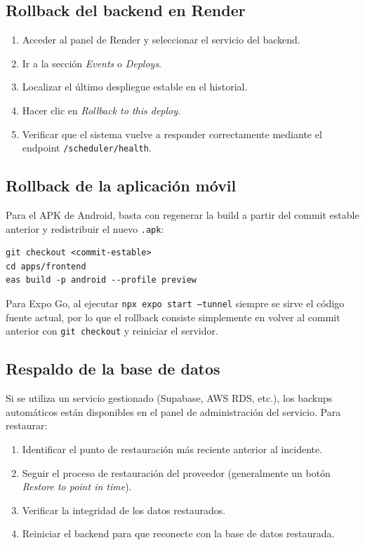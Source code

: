 \subsection{Rollback del backend en Render}

\begin{enumerate}
    \item Acceder al panel de Render y seleccionar el servicio del backend.
    \item Ir a la sección \textit{Events} o \textit{Deploys}.
    \item Localizar el último despliegue estable en el historial.
    \item Hacer clic en \textit{Rollback to this deploy}.
    \item Verificar que el sistema vuelve a responder correctamente mediante el endpoint \texttt{/scheduler/health}.
\end{enumerate}

\subsection{Rollback de la aplicación móvil}

Para el APK de Android, basta con regenerar la build a partir del commit estable anterior y redistribuir el nuevo \texttt{.apk}:

\begin{lstlisting}
git checkout <commit-estable>
cd apps/frontend
eas build -p android --profile preview
\end{lstlisting}

Para Expo Go, al ejecutar \texttt{npx expo start --tunnel} siempre se sirve el código fuente actual, por lo que el rollback consiste simplemente en volver al commit anterior con \texttt{git checkout} y reiniciar el servidor.

\subsection{Respaldo de la base de datos}

Si se utiliza un servicio gestionado (Supabase, AWS RDS, etc.), los backups automáticos están disponibles en el panel de administración del servicio. Para restaurar:

\begin{enumerate}
    \item Identificar el punto de restauración más reciente anterior al incidente.
    \item Seguir el proceso de restauración del proveedor (generalmente un botón \textit{Restore to point in time}).
    \item Verificar la integridad de los datos restaurados.
    \item Reiniciar el backend para que reconecte con la base de datos restaurada.
\end{enumerate}

